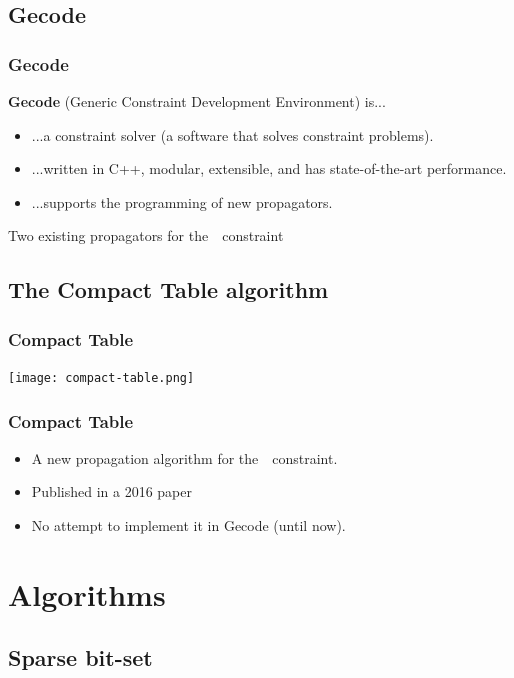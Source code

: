 \documentclass{beamer}
\newcommand{\Table}{\Constraint{Table}}
\newcommand{\CTpaper}[0]{DBLP:conf/cp/DemeulenaereHLP16}
\begin{document}
\subsection{Gecode}

\begin{frame}
  \frametitle{Gecode}
  \textbf{Gecode} (Generic Constraint Development Environment)
  is...

  \begin{itemize}
    \item ...a constraint solver (a software that solves constraint problems).
    \item ...written in C++, modular, extensible, and has state-of-the-art performance.
    \item ...supports the programming of new propagators.
  \end{itemize}

  Two existing propagators for the~\Table~constraint

\end{frame}

\subsection{The Compact Table algorithm}

\begin{frame}
  \frametitle{Compact Table}
  \texttt{[image: compact-table.png]}
\end{frame}

\begin{frame}
  \frametitle{Compact Table}
  \begin{itemize}
  \item   A new propagation algorithm for the~\Table~constraint.
  \item   Published in a 2016 paper%
  \item   No attempt to implement it in Gecode (until now).
  \end{itemize}

\end{frame}

\section{Algorithms}

\subsection{Sparse bit-set}
\end{document}
